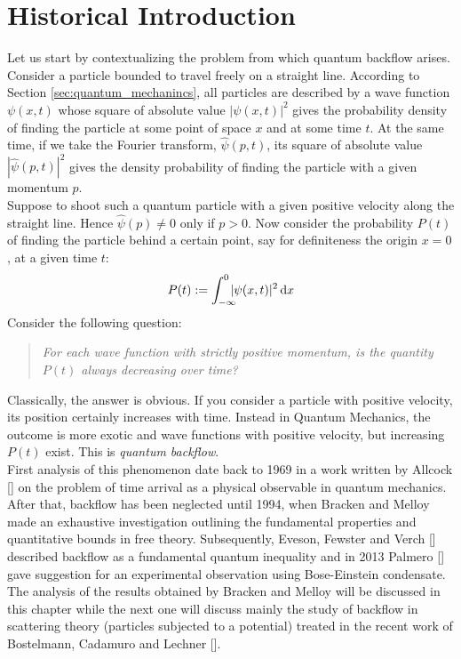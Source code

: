 \section{Historical Introduction}
Let us start by contextualizing the problem from which quantum backflow arises. Consider a particle bounded to travel freely on a straight line. According to Section \ref{sec:quantum_mechanincs}, all particles are described by a wave function $\psi(x,t)$ whose square of absolute value $|\psi(x,t)|^2$ gives the probability density of finding the particle at some point of space $x$ and at some time $t$. At the same time, if we take the Fourier transform, $\hat{\psi}(p,t)$, its square of absolute value $|\hat{\psi}(p,t)|^2$ gives the density probability of finding the particle with a given momentum $p$.\\
Suppose to shoot such a quantum particle with a given positive velocity along the straight line. Hence $\hat{\psi}(p)\neq 0$ only if $p>0$. Now consider the probability $P(t)$ of finding the particle behind a certain point, say for definiteness the origin $x=0$, at a given time $t$:
\begin{equation}
	P(t):=\int_{-\infty}^{0}\!\!\!\!|\psi(x,t)|^2\, \mathrm d x
\end{equation}
Consider the following question:
\begin{verse}
	\centering
	\emph{For each wave function with strictly positive momentum, is the quantity $P(t)$ always decreasing over time?}
	\end{verse}
Classically, the answer is obvious. If you consider a particle with positive velocity, its position certainly increases with time. Instead in Quantum Mechanics, the outcome is more exotic and wave functions with positive velocity, but increasing $P(t)$ exist. This is \textit{quantum backflow}.\\
First analysis of this phenomenon date back to 1969 in a work written by Allcock [\citealp{allcock}] on the problem of time arrival as a physical observable in quantum mechanics. After that, backflow has been neglected until 1994, when Bracken and Melloy made an exhaustive investigation outlining the fundamental properties and quantitative bounds in free theory. Subsequently, Eveson, Fewster and Verch [\citealp{verch}] described backflow as a fundamental quantum inequality and in 2013 Palmero [\citealp{palmero}] gave suggestion for an experimental observation using Bose-Einstein condensate. The analysis of the results obtained by Bracken and Melloy will be discussed in this chapter while the next one will discuss mainly the study of backflow in scattering theory (particles subjected to a potential) treated in the recent work of Bostelmann, Cadamuro and Lechner [\citealp{gand}].


